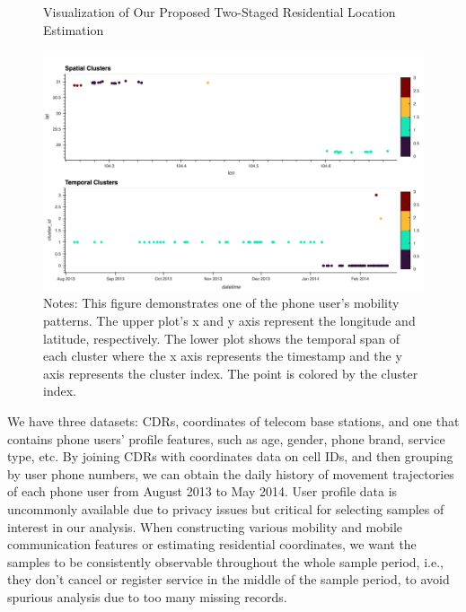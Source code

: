 \vspace{0.3cm}
\begin{figure}[h!]
\centering
\caption{Visualization of Our Proposed Two-Staged Residential Location Estimation}
\vspace{0.1cm}

\includegraphics[width=1\textwidth]{figures/cluster_res.png}

\vspace{0.1cm}
\caption*{Notes:  This figure demonstrates one of the phone user's mobility patterns. The upper plot's x and y axis represent the longitude and latitude, respectively. The lower plot shows the temporal span of each cluster where the x axis represents the timestamp and the y axis represents the cluster index. The point is colored by the cluster index.}
\label{fig:cluster}
\end{figure}



We have three datasets: CDRs, coordinates of telecom base stations, and one that contains phone users' profile features, such as age, gender, phone brand, service type, etc. By joining CDRs with coordinates data on cell IDs, and then grouping by user phone numbers, we can obtain the daily history of movement trajectories of each phone user from August 2013 to May 2014. User profile data is uncommonly available due to privacy issues but critical for selecting samples of interest in our analysis. When constructing various mobility and mobile communication features or estimating residential coordinates, we want the samples to be consistently observable throughout the whole sample period, i.e., they don't cancel or register service in the middle of the sample period, to avoid spurious analysis due to too many missing records.

